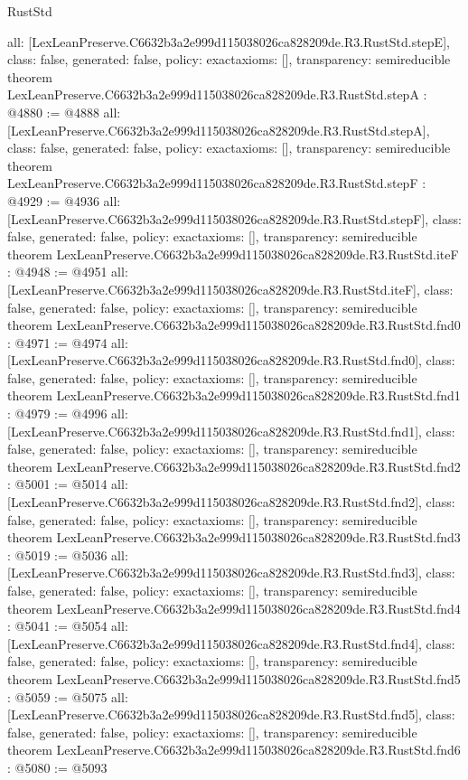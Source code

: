 \begin{lexlean}{RustStd}
\begin{coremodule}
{  all: [LexLeanPreserve.C6632b3a2e999d115038026ca828209de.R3.RustStd.stepE],
  class: false,
  generated: false,
  policy: exact{axioms: []},
  transparency: semireducible
}
theorem LexLeanPreserve.C6632b3a2e999d115038026ca828209de.R3.RustStd.stepA : @4880 := @4888 {
  all: [LexLeanPreserve.C6632b3a2e999d115038026ca828209de.R3.RustStd.stepA],
  class: false,
  generated: false,
  policy: exact{axioms: []},
  transparency: semireducible
}
theorem LexLeanPreserve.C6632b3a2e999d115038026ca828209de.R3.RustStd.stepF : @4929 := @4936 {
  all: [LexLeanPreserve.C6632b3a2e999d115038026ca828209de.R3.RustStd.stepF],
  class: false,
  generated: false,
  policy: exact{axioms: []},
  transparency: semireducible
}
theorem LexLeanPreserve.C6632b3a2e999d115038026ca828209de.R3.RustStd.iteF : @4948 := @4951 {
  all: [LexLeanPreserve.C6632b3a2e999d115038026ca828209de.R3.RustStd.iteF],
  class: false,
  generated: false,
  policy: exact{axioms: []},
  transparency: semireducible
}
theorem LexLeanPreserve.C6632b3a2e999d115038026ca828209de.R3.RustStd.fnd0 : @4971 := @4974 {
  all: [LexLeanPreserve.C6632b3a2e999d115038026ca828209de.R3.RustStd.fnd0],
  class: false,
  generated: false,
  policy: exact{axioms: []},
  transparency: semireducible
}
theorem LexLeanPreserve.C6632b3a2e999d115038026ca828209de.R3.RustStd.fnd1 : @4979 := @4996 {
  all: [LexLeanPreserve.C6632b3a2e999d115038026ca828209de.R3.RustStd.fnd1],
  class: false,
  generated: false,
  policy: exact{axioms: []},
  transparency: semireducible
}
theorem LexLeanPreserve.C6632b3a2e999d115038026ca828209de.R3.RustStd.fnd2 : @5001 := @5014 {
  all: [LexLeanPreserve.C6632b3a2e999d115038026ca828209de.R3.RustStd.fnd2],
  class: false,
  generated: false,
  policy: exact{axioms: []},
  transparency: semireducible
}
theorem LexLeanPreserve.C6632b3a2e999d115038026ca828209de.R3.RustStd.fnd3 : @5019 := @5036 {
  all: [LexLeanPreserve.C6632b3a2e999d115038026ca828209de.R3.RustStd.fnd3],
  class: false,
  generated: false,
  policy: exact{axioms: []},
  transparency: semireducible
}
theorem LexLeanPreserve.C6632b3a2e999d115038026ca828209de.R3.RustStd.fnd4 : @5041 := @5054 {
  all: [LexLeanPreserve.C6632b3a2e999d115038026ca828209de.R3.RustStd.fnd4],
  class: false,
  generated: false,
  policy: exact{axioms: []},
  transparency: semireducible
}
theorem LexLeanPreserve.C6632b3a2e999d115038026ca828209de.R3.RustStd.fnd5 : @5059 := @5075 {
  all: [LexLeanPreserve.C6632b3a2e999d115038026ca828209de.R3.RustStd.fnd5],
  class: false,
  generated: false,
  policy: exact{axioms: []},
  transparency: semireducible
}
theorem LexLeanPreserve.C6632b3a2e999d115038026ca828209de.R3.RustStd.fnd6 : @5080 := @5093 {
}
\end{coremodule}
\end{lexlean}
